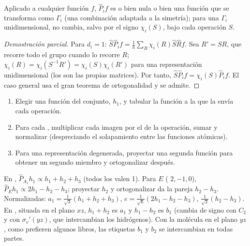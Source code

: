 \begin{proposition}\label{prop:b3:group-theory-applied:projection}
Aplicado a cualquier función $f$, $\hat P_if$ es o bien nula o bien una función que
se transforma como $\Gamma_i$ (una combinación adaptada a la simetría); para una
$\Gamma_i$ unidimensional, no cambia, salvo por el signo $\chi_i(S)$, bajo cada
operación $S$.
\end{proposition}

\begin{proof}[Demostración parcial]
Para $d_i = 1$: $\hat S\hat P_if = \frac1h\sum_R\chi_i(R)\hat S\hat Rf$. Sea $R' = SR$,
que recorre todo el grupo cuando lo recorre $R$; $\chi_i(R) = \chi_i(S^{-1}R') =
\chi_i(S)\chi_i(R')$ para una representación unidimensional (los  son
las propias matrices). Por tanto, $\hat S\hat P_if = \chi_i(S)\hat P_if$. El caso
general usa el gran teorema de ortogonalidad y se admite.
\end{proof}

\begin{method}\label{met:b3:group-theory-applied:salc}
\begin{enumerate}
  \item Elegir una función del conjunto, $h_1$, y tabular la función a la que
        la envía cada operación.
  \item Para cada , multiplicar cada imagen por el
         de la operación, sumar y normalizar (despreciando el solapamiento
        entre las funciones atómicas).
  \item Para una representación degenerada, proyectar una segunda función para obtener
        un segundo miembro y ortogonalizar después.
\end{enumerate}
\end{method}

\begin{example}\label{ex:b3:group-theory-applied:salcs}
En , $\hat P_{A_1}h_1 \propto h_1 + h_2 + h_3$ (todos los  valen 1). Para $E$
( $2, -1, 0$), $\hat P_Eh_1 \propto 2h_1 - h_2 - h_3$; proyectar $h_2$ y
ortogonalizar da la pareja $h_2 - h_3$. Normalizadas: $a_1 =
\frac{1}{\sqrt3}(h_1 + h_2 + h_3)$, $e = \frac{1}{\sqrt6}(2h_1 - h_2 - h_3)$,
$\frac{1}{\sqrt2}(h_2 - h_3)$. En , situada en el plano $xz$, $h_1 + h_2$ es
$a_1$ y $h_1 - h_2$ es $b_1$ (cambia de signo con $C_2$ y con $\sigma_v'(yz)$,
que intercambian los hidrógenos). Con la molécula en el plano $yz$, como prefieren algunos
libros, las etiquetas $b_1$ y $b_2$ se intercambian en todas partes.
\end{example}

